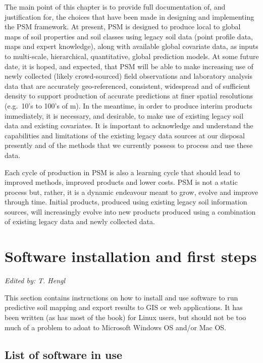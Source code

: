 \documentclass[11pt]{krantz}
\theoremstyle{definition}
\theoremstyle{definition}
\theoremstyle{definition}
\theoremstyle{remark}
\begin{document}
The main point of this chapter is to provide full documentation of, and
justification for, the choices that have been made in designing and
implementing the PSM framework. At present, PSM is designed to produce
local to global maps of soil properties and soil classes using legacy
soil data (point profile data, maps and expert knowledge), along with
available global covariate data, as inputs to multi-scale, hierarchical,
quantitative, global prediction models. At some future date, it is
hoped, and expected, that PSM will be able to make increasing use of
newly collected (likely crowd-sourced) field observations and laboratory
analysis data that are accurately geo-referenced, consistent, widespread
and of sufficient density to support production of accurate predictions
at finer spatial resolutions (e.g.~10's to 100's of m). In the meantime,
in order to produce interim products immediately, it is necessary, and
desirable, to make use of existing legacy soil data and existing
covariates. It is important to acknowledge and understand the
capabilities and limitations of the existing legacy data sources at our
disposal presently and of the methods that we currently possess to
process and use these data.

Each cycle of production in PSM is also a learning cycle that should
lead to improved methods, improved products and lower costs. PSM is not
a static process but, rather, it is a dynamic endeavour meant to grow,
evolve and improve through time. Initial products, produced using
existing legacy soil information sources, will increasingly evolve into
new products produced using a combination of existing legacy data and
newly collected data.

\hypertarget{software}{%
\chapter{Software installation and first steps}\label{software}}

\emph{Edited by: T. Hengl}

This section contains instructions on how to install and use software to
run predictive soil mapping and export results to GIS or web
applications. It has been written (as has most of the book) for Linux
users, but should not be too much of a problem to adoat to Microsoft
Windows OS and/or Mac OS.

\hypertarget{list-of-software-in-use}{%
\section{List of software in use}\label{list-of-software-in-use}}
\end{document}
